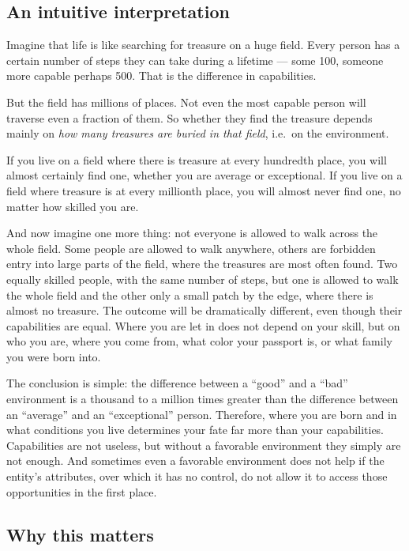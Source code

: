 \documentclass[12pt,a4paper]{article}
\begin{document}
\subsection{An intuitive interpretation}

Imagine that life is like searching for treasure on a huge field. Every person has a certain number of steps they can take during a lifetime — some 100, someone more capable perhaps 500. That is the difference in capabilities.

But the field has millions of places. Not even the most capable person will traverse even a fraction of them. So whether they find the treasure depends mainly on \emph{how many treasures are buried in that field}, i.e.\ on the environment.

If you live on a field where there is treasure at every hundredth place, you will almost certainly find one, whether you are average or exceptional. If you live on a field where treasure is at every millionth place, you will almost never find one, no matter how skilled you are.

And now imagine one more thing: not everyone is allowed to walk across the whole field. Some people are allowed to walk anywhere, others are forbidden entry into large parts of the field, where the treasures are most often found. Two equally skilled people, with the same number of steps, but one is allowed to walk the whole field and the other only a small patch by the edge, where there is almost no treasure. The outcome will be dramatically different, even though their capabilities are equal. Where you are let in does not depend on your skill, but on who you are, where you come from, what color your passport is, or what family you were born into.

The conclusion is simple: the difference between a ``good'' and a ``bad'' environment is a thousand to a million times greater than the difference between an ``average'' and an ``exceptional'' person. Therefore, where you are born and in what conditions you live determines your fate far more than your capabilities. Capabilities are not useless, but without a favorable environment they simply are not enough. And sometimes even a favorable environment does not help if the entity's attributes, over which it has no control, do not allow it to access those opportunities in the first place.

\subsection{Why this matters}
\end{document}
